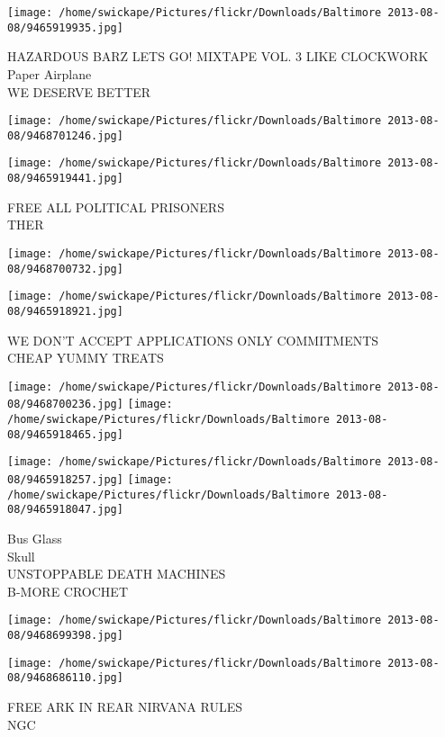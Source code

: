 \documentclass[10pt,letterpaper]{article}
\begin{document}
\texttt{[image: /home/swickape/Pictures/flickr/Downloads/Baltimore 2013-08-08/9465919935.jpg]}

HAZARDOUS BARZ LETS GO! MIXTAPE VOL. 3 LIKE CLOCKWORK\\
Paper Airplane\\
WE DESERVE BETTER
\pagebreak

\texttt{[image: /home/swickape/Pictures/flickr/Downloads/Baltimore 2013-08-08/9468701246.jpg]}

\vspace{0.25in}
\texttt{[image: /home/swickape/Pictures/flickr/Downloads/Baltimore 2013-08-08/9465919441.jpg]}

FREE ALL POLITICAL PRISONERS\\
THER
\pagebreak

\texttt{[image: /home/swickape/Pictures/flickr/Downloads/Baltimore 2013-08-08/9468700732.jpg]}

\vspace{0.25in}
\texttt{[image: /home/swickape/Pictures/flickr/Downloads/Baltimore 2013-08-08/9465918921.jpg]}

WE DON'T ACCEPT APPLICATIONS ONLY COMMITMENTS\\
CHEAP YUMMY TREATS
\pagebreak

\texttt{[image: /home/swickape/Pictures/flickr/Downloads/Baltimore 2013-08-08/9468700236.jpg]}
\texttt{[image: /home/swickape/Pictures/flickr/Downloads/Baltimore 2013-08-08/9465918465.jpg]}

\texttt{[image: /home/swickape/Pictures/flickr/Downloads/Baltimore 2013-08-08/9465918257.jpg]}
\texttt{[image: /home/swickape/Pictures/flickr/Downloads/Baltimore 2013-08-08/9465918047.jpg]}

Bus Glass\\
Skull\\
UNSTOPPABLE DEATH MACHINES\\
B{-}MORE CROCHET
\pagebreak

\texttt{[image: /home/swickape/Pictures/flickr/Downloads/Baltimore 2013-08-08/9468699398.jpg]}

\vspace{0.25in}
\texttt{[image: /home/swickape/Pictures/flickr/Downloads/Baltimore 2013-08-08/9468686110.jpg]}

FREE ARK IN REAR NIRVANA RULES\\
NGC
\pagebreak
\end{document}
